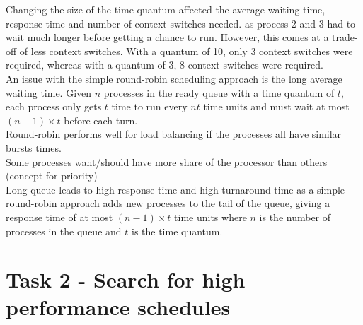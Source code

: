 \documentclass{article}
\newcommand{\n}[0]{\\[\baselineskip]}
\begin{document}
 
Changing the size of the time quantum affected the average waiting time, response time and number of context switches needed. as process 2 and 3 had to wait much longer before getting a chance to run. However, this comes at a trade-off of less context switches. With a quantum of 10, only 3 context switches were required, whereas with a quantum of 3, 8 context switches were required. 
\n
An issue with the simple round-robin scheduling approach is the long average waiting time. Given $n$ processes in the ready queue with a time quantum of $t$, each process only gets $t$ time to run every $nt$ time units and must wait at most $(n - 1) \times t$ before each turn. 
\n
Round-robin performs well for load balancing if the processes all have similar bursts times. 
\n
Some processes want/should have more share of the processor than others (concept for priority)
\n
Long queue leads to high response time and high turnaround time as a simple round-robin approach adds new processes to the tail of the queue, giving a response time of at most $(n - 1) \times t$ time units where $n$ is the number of processes in the queue and $t$ is the time quantum.
\section{Task 2 - Search for high performance schedules}
\end{document}
